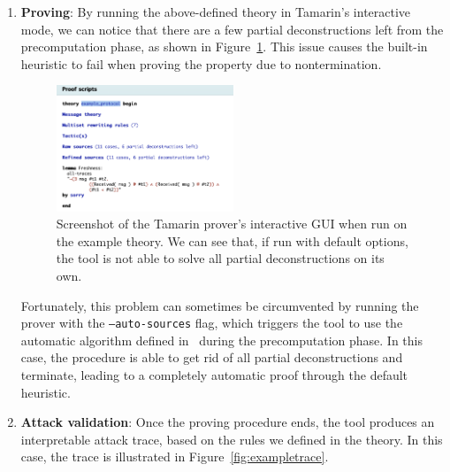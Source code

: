 \begin{enumerate}
    \item \textbf{Proving}: By running the above-defined theory in Tamarin's interactive mode, we can notice that there are a few partial deconstructions left from the precomputation phase, as shown in Figure~\ref{fig:exampledeconstructions}. This issue causes the built-in heuristic to fail when proving the property due to nontermination.
        \begin{figure}
            \includegraphics[width=0.5\textwidth]{Figures/exampledeconstructions.png}
            \centering
            \caption{Screenshot of the Tamarin prover's interactive GUI when run on the example theory. We can see that, if run with default options, the tool is not able to solve all partial deconstructions on its own.}
            \label{fig:exampledeconstructions}
        \end{figure}
        Fortunately, this problem can sometimes be circumvented by running the prover with the \texttt{--auto-sources} flag, which triggers the tool to use the automatic algorithm defined in~\cite{autosources} during the precomputation phase. In this case, the procedure is able to get rid of all partial deconstructions and terminate, leading to a completely automatic proof through the default heuristic.

    \item \textbf{Attack validation}: Once the proving procedure ends, the tool produces an interpretable attack trace, based on the rules we defined in the theory. In this case, the trace is illustrated in Figure~\ref{fig:exampletrace}.


\end{enumerate}
